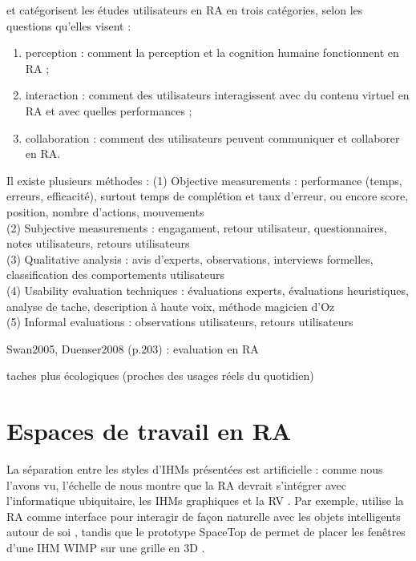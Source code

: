 \cite{Swan2005} et \cite{Duenser2008} catégorisent les études utilisateurs en RA en trois catégories, selon les questions qu'elles visent :
\begin{enumerate}
  \item perception : comment la perception et la cognition humaine fonctionnent en RA ;
  \item interaction : comment des utilisateurs interagissent avec du contenu virtuel en RA et avec quelles performances ;
  \item collaboration : comment des utilisateurs peuvent communiquer et collaborer en RA.
\end{enumerate}
\medskip

Il existe plusieurs méthodes :
(1) Objective measurements : performance (temps, erreurs, efficacité), surtout temps de complétion et taux d'erreur, ou encore score, position, nombre d'actions, mouvements\\
(2) Subjective measurements : engagament, retour utilisateur, questionnaires, notes utilisateurs, retours utilisateurs\\
(3) Qualitative analysis : avis d'experts, observations, interviews formelles, classification des comportements utilisateurs\\
(4) Usability evaluation techniques : évaluations experts, évaluations heuristiques, analyse de tache, description à haute voix, méthode magicien d'Oz\\
(5) Informal evaluations : observations utilisateurs, retours utilisateurs

Swan2005, Duenser2008 (p.203) : evaluation en RA

\cite[p. 20]{Jankowski2015}

taches plus écologiques (proches des usages réels du quotidien)


\section{Espaces de travail en RA}
\label{sec:litterature_ar_worspaces}
La séparation entre les styles d'IHMs présentées \cite{Rekimoto1995}  est artificielle : comme nous l'avons vu, l'échelle de \cite{Milgram1994} nous montre que la RA devrait s'intégrer avec l'informatique ubiquitaire, les IHMs graphiques et la RV \cite{Billinghurst2005}. Par exemple, \cite{Heun2016} utilise la RA comme interface pour interagir de façon naturelle avec les objets intelligents autour de soi , tandis que le prototype SpaceTop de \cite{Lee2013} permet de placer les fenêtres d'une IHM WIMP sur une grille en 3D .

